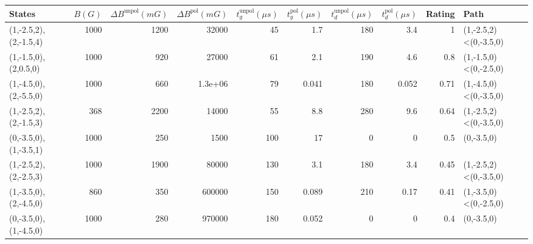 \begin{tabular}{lrrrrrrrrl}
\hline
 {States}              &   {$B(G)$} &   {$\Delta B^{\text{unpol}}(mG)$} &   {$\Delta B^{\text{pol}}(mG)$} &   {$t^{\text{unpol}}_{g}(\mu s)$} &   {$t^{\text{pol}}_{g}(\mu s)$} &   {$t^{\text{unpol}}_{d}(\mu s)$} &   {$t^{\text{pol}}_{d}(\mu s)$} &   {Rating} & {Path}                \\
\hline
 (1,-2.5,2),(2,-1.5,4) &       1000 &                              1200 &                     32000       &                                45 &                           1.7   &                               180 &                           3.4   &       1    & (1,-2.5,2)<(0,-3.5,0) \\
 (1,-1.5,0),(2,0.5,0)  &       1000 &                               920 &                     27000       &                                61 &                           2.1   &                               190 &                           4.6   &       0.8  & (1,-1.5,0)<(0,-2.5,0) \\
 (1,-4.5,0),(2,-5.5,0) &       1000 &                               660 &                         1.3e+06 &                                79 &                           0.041 &                               180 &                           0.052 &       0.71 & (1,-4.5,0)<(0,-3.5,0) \\
 (1,-2.5,2),(2,-1.5,3) &        368 &                              2200 &                     14000       &                                55 &                           8.8   &                               280 &                           9.6   &       0.64 & (1,-2.5,2)<(0,-3.5,0) \\
 (0,-3.5,0),(1,-3.5,1) &       1000 &                               250 &                      1500       &                               100 &                          17     &                                 0 &                           0     &       0.5  & (0,-3.5,0)            \\
 (1,-2.5,2),(2,-2.5,3) &       1000 &                              1900 &                     80000       &                               130 &                           3.1   &                               180 &                           3.4   &       0.45 & (1,-2.5,2)<(0,-3.5,0) \\
 (1,-3.5,0),(2,-4.5,0) &        860 &                               350 &                    600000       &                               150 &                           0.089 &                               210 &                           0.17  &       0.41 & (1,-3.5,0)<(0,-2.5,0) \\
 (0,-3.5,0),(1,-4.5,0) &       1000 &                               280 &                    970000       &                               180 &                           0.052 &                                 0 &                           0     &       0.4  & (0,-3.5,0)            \\
\hline
\end{tabular}